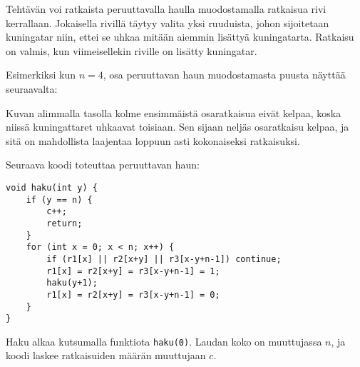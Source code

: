 Tehtävän voi ratkaista peruuttavalla haulla
muodostamalla ratkaisua rivi kerrallaan.
Jokaisella rivillä täytyy valita yksi ruuduista,
johon sijoitetaan kuningatar niin,
ettei se uhkaa mitään aiemmin lisättyä kuningatarta.
Ratkaisu on valmis, kun viimeisellekin
riville on lisätty kuningatar.

Esimerkiksi kun $n=4$, osa peruuttavan haun muodostamasta
puusta näyttää seuraavalta:

\begin{center}
\end{center}

Kuvan alimmalla tasolla kolme ensimmäistä osaratkaisua
eivät kelpaa, koska niissä kuningattaret uhkaavat
toisiaan.
Sen sijaan neljäs osaratkaisu kelpaa,
ja sitä on mahdollista laajentaa loppuun asti
kokonaiseksi ratkaisuksi.

\begin{samepage}
Seuraava koodi toteuttaa peruuttavan haun:

\begin{lstlisting}
void haku(int y) {
    if (y == n) {
        c++;
        return;
    }
    for (int x = 0; x < n; x++) {
        if (r1[x] || r2[x+y] || r3[x-y+n-1]) continue;
        r1[x] = r2[x+y] = r3[x-y+n-1] = 1;
        haku(y+1);
        r1[x] = r2[x+y] = r3[x-y+n-1] = 0;
    }
}
\end{lstlisting}
\end{samepage}
Haku alkaa kutsumalla funktiota \texttt{haku(0)}.
Laudan koko on muuttujassa $n$,
ja koodi laskee ratkaisuiden määrän
muuttujaan $c$.


